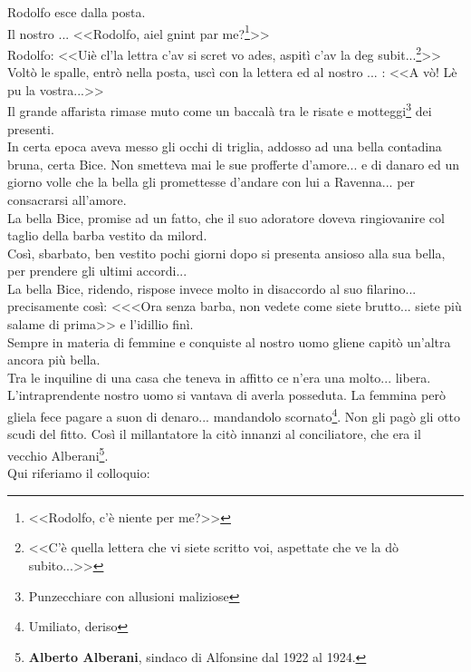 \indent Rodolfo esce dalla posta.\\
\indent Il nostro .\:.\:.\: <<Rodolfo, aiel gnint par me?\footnote{<<Rodolfo, c'è niente per me?>>}>>\\
\indent Rodolfo: <<Uiè cl'la lettra c'av si scret vo ades, aspitì c'av la deg subit...\footnote{<<C'è quella lettera che vi siete scritto voi, aspettate che ve la dò subito...>>}>>\\
\indent Voltò le spalle, entrò nella posta, uscì con la lettera ed al nostro .\:.\:.\: : <<A vò! Lè pu la vostra...>>\\
\indent Il grande affarista rimase muto come un baccalà tra le risate e motteggi\footnote{Punzecchiare con allusioni maliziose} dei presenti.\\
\indent In certa epoca aveva messo gli occhi di triglia, addosso ad una bella contadina bruna, certa Bice. Non smetteva mai le sue profferte d'amore... e di danaro ed un giorno volle che la bella gli promettesse d'andare con lui a Ravenna... per consacrarsi all'amore.\\
\indent La bella Bice, promise ad un fatto, che il suo adoratore doveva ringiovanire col taglio della barba vestito da milord.\\
\indent Così, sbarbato, ben vestito pochi giorni dopo si presenta ansioso alla sua bella, per prendere gli ultimi accordi...\\
\indent La bella Bice, ridendo, rispose invece molto in disaccordo al suo filarino... precisamente così: <<<Ora senza barba, non vedete come siete brutto... siete più salame di prima>> e l'idillio finì.\\
\indent Sempre in materia di femmine e conquiste al nostro uomo gliene capitò un'altra ancora più bella.\\
\indent Tra le inquiline di una casa che teneva in affitto ce n'era una molto... libera. L'intraprendente nostro uomo si vantava di averla posseduta. La femmina però gliela fece pagare a suon di denaro... mandandolo scornato\footnote{Umiliato, deriso}. Non gli pagò gli otto scudi del fitto. Così il millantatore la citò innanzi al conciliatore, che era il vecchio Alberani\footnote{\textbf{Alberto Alberani}, sindaco di Alfonsine dal 1922 al 1924.}.\\
\indent Qui riferiamo il colloquio:\\
